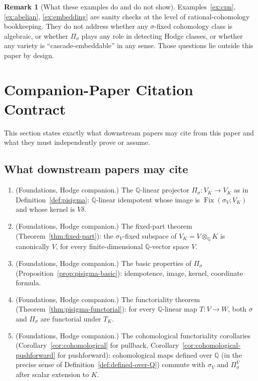 \documentclass[11pt, a4paper]{amsart}
\theoremstyle{definition}
\newtheorem{remark}[theorem]{Remark}
\newcommand{\Q}{\mathbb{Q}}
\newcommand{\Fix}{\operatorname{Fix}}
\begin{document}
\begin{remark}[What these examples do and do not show]
Examples~\ref{ex:cpn}, \ref{ex:abelian}, \ref{ex:embedding} are
sanity checks at the level of rational-cohomology bookkeeping.
They do not address whether any $\sigma$-fixed cohomology class is
algebraic, or whether $\Pi_\sigma$ plays any role in detecting
Hodge classes, or whether any variety is ``cascade-embeddable'' in
any sense. Those questions lie outside this paper by design.
\end{remark}

\section{Companion-Paper Citation Contract}
\label{sec:handoff}

This section states exactly what downstream papers may cite from
this paper and what they must independently prove or assume.

\subsection{What downstream papers may cite}

\begin{enumerate}
\item (Foundations, Hodge companion.) The $\Q$-linear projector
  $\Pi_\sigma \colon V_K \to V_K$ as in Definition~\ref{def:pisigma}:
  $\Q$-linear idempotent whose image is $\Fix(\sigma_V; V_K)$ and
  whose kernel is $V\delta$.
\item (Foundations, Hodge companion.) The fixed-part theorem
  (Theorem~\ref{thm:fixed-part}): the $\sigma_V$-fixed subspace of
  $V_K = V \otimes_\Q K$ is canonically $V$, for every
  finite-dimensional $\Q$-vector space $V$.
\item (Foundations, Hodge companion.) The basic properties of
  $\Pi_\sigma$ (Proposition~\ref{prop:pisigma-basic}): idempotence,
  image, kernel, coordinate formula.
\item (Foundations, Hodge companion.) The functoriality theorem
  (Theorem~\ref{thm:pisigma-functorial}): for every $\Q$-linear map
  $T \colon V \to W$, both $\sigma$ and $\Pi_\sigma$ are
  functorial under $T_K$.
\item (Foundations, Hodge companion.) The cohomological
  functoriality corollaries
  (Corollary~\ref{cor:cohomological} for pullback,
  Corollary~\ref{cor:cohomological-pushforward} for pushforward):
  cohomological maps defined over $\Q$ (in the precise sense of
  Definition~\ref{def:defined-over-Q}) commute with $\sigma_V$ and
  $\Pi_\sigma^V$ after scalar extension to $K$.
\end{enumerate}
\end{document}
